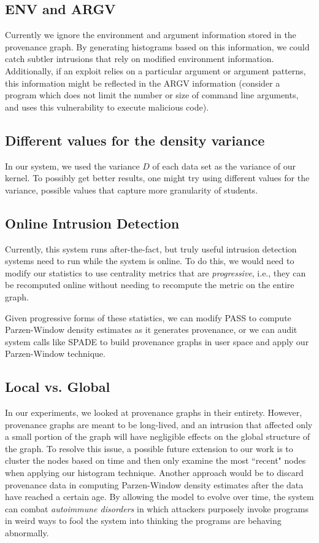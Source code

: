 \documentclass[10pt,twocolumn]{article}
\begin{document}
\subsection{ENV and ARGV}
Currently we ignore the environment and argument information stored in the provenance graph. By generating histograms based on this information, we could catch subtler intrusions that rely on modified environment information. Additionally, if an exploit relies on a particular argument or argument patterns, this information might be reflected in the ARGV information (consider a program which does not limit the number or size of command line arguments, and uses this vulnerability to execute malicious code).
\subsection{Different values for the density variance}
In our system, we used the variance $D$ of each data set as the variance of our kernel. To possibly get better results, one might try using different values for the variance, possible values that capture more granularity of students.
\subsection{Online Intrusion Detection}
Currently, this system runs after-the-fact, but truly useful intrusion detection systems need to run while the system is online. To do this, we would need to modify our statistics to use centrality metrics that are {\em progressive}, i.e., they can be recomputed online without needing to recompute the metric on the entire graph. 

Given progressive forms of these statistics, we can modify PASS to compute Parzen-Window density estimates as it generates provenance, or we can audit system calls like SPADE \cite{spade} to build provenance graphs in user space and apply our Parzen-Window technique.
\subsection{Local vs. Global}
In our experiments, we looked at provenance graphs in their entirety. However, provenance graphs are meant to be long-lived, and an intrusion that affected only a small portion of the graph will have negligible effects on the global structure of the graph. To resolve this issue, a possible future extension to our work is to cluster the nodes based on time \cite{clustering} and then only examine the most ``recent" nodes when applying our histogram technique. Another approach would be to discard provenance data in computing Parzen-Window density estimates after the data have reached a certain age. By allowing the model to evolve over time, the system
can combat {\em autoimmune disorders} in which attackers purposely invoke programs in weird ways to fool the system into thinking the programs are
behaving abnormally.
\end{document}
